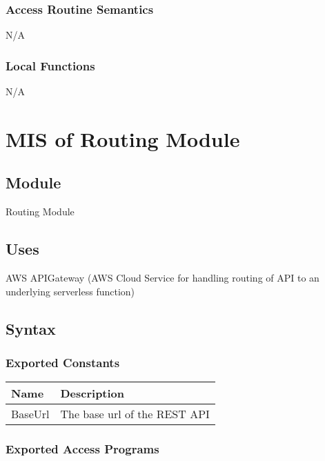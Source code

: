 \documentclass[12pt, titlepage]{article}
\begin{document}
\subsubsection{Access Routine Semantics}

N/A

\subsubsection{Local Functions}

N/A

\section{MIS of Routing Module} \label{Module}

\subsection{Module}

Routing Module

\subsection{Uses}

AWS APIGateway (AWS Cloud Service for handling routing of API to an
underlying serverless function)

\subsection{Syntax}

\subsubsection{Exported Constants}

\begin{center}
  \begin{tabular}{p{4cm} p{12cm}}
    \hline
    \textbf{Name} & \textbf{Description} \\
    \hline
    BaseUrl & The base url of the REST API \\
    \hline
  \end{tabular}
\end{center}

\subsubsection{Exported Access Programs}
\end{document}
